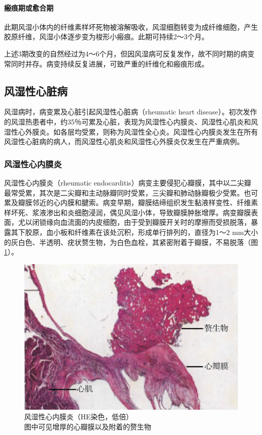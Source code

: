 \paragraph{瘢痕期或愈合期}
此期风湿小体内的纤维素样坏死物被溶解吸收，风湿细胞转变为成纤维细胞，产生胶原纤维，风湿小体逐步变为梭形小瘢痕。此期可持续2～3个月。

上述3期改变的自然经过为4～6个月，但因风湿病可反复发作，故不同时期的病变常同时并存。病变持续反复进展，可致严重的纤维化和瘢痕形成。

\subsection{风湿性心脏病}

风湿病时，病变累及心脏引起风湿性心脏病（rheumatic heart
disease）。初次发作的风湿热患者中，约35％可累及心脏，表现为风湿性心内膜炎、风湿性心肌炎和风湿性心外膜炎。如各层均受累，则称为风湿性全心炎。风湿性心内膜炎发生在所有风湿性心脏病的病人，而风湿性心肌炎和风湿性心外膜炎仅发生在严重病例。

\subsubsection{风湿性心内膜炎}

风湿性心内膜炎（rheumatic
endocarditis）病变主要侵犯心瓣膜，其中以二尖瓣最常受累，其次是二尖瓣和主动脉瓣同时受累，三尖瓣和肺动脉瓣极少受累。也可累及瓣膜邻近的心内膜和腱索。病变早期，瓣膜结缔组织发生黏液样变性、纤维素样坏死、浆液渗出和炎细胞浸润，偶见风湿小体，导致瓣膜肿胀增厚。病变瓣膜表面，尤以闭锁缘向血流面的内皮细胞，由于受到瓣膜开关时的摩擦而受损脱落，暴露其下胶原，血小板和纤维素在该处沉积，形成单行排列的，直径为1～2
mm大小的灰白色、半透明、疣状赘生物，为白色血栓，其紧密附着于瓣膜，不易脱落（图\ref{fig6-11}）。

\begin{figure}[!htbp]
    \centering
    \includegraphics{./images/Image00103.jpg}
    \captionsetup{justification=centering}
    \caption{风湿性心内膜炎（HE染色，低倍）\\{\small 图中可见增厚的心瓣膜以及附着的赘生物}}
    \label{fig6-11}
\end{figure}



